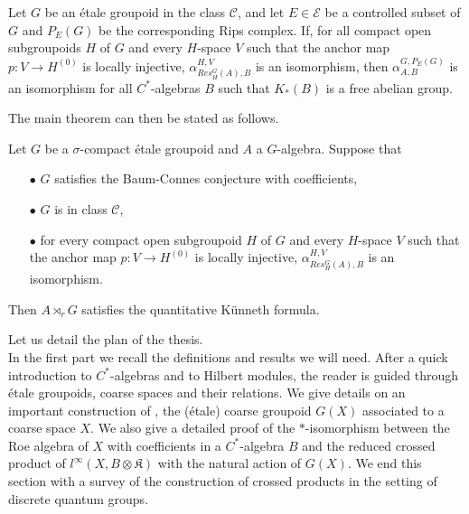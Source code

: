 \begin{itemize}
\begin{thm}
Let $G$ be an étale groupoid in the class $\mathcal C$, and let $E\in\mathcal E$ be a controlled subset of $G$ and $P_E(G)$ be the corresponding Rips complex. If, for all compact open subgroupoids $H$ of $G$ and every $H$-space $V$ such that the anchor map $p : V\rightarrow H^{(0)}$ is locally injective, $\alpha_{Res_H^G(A),B}^{H,V}$ is an isomorphism, then $\alpha_{A,B}^{G,P_E(G)}$ is an isomorphism for all $C^*$-algebras $B$ such that $K_*(B)$ is a free abelian group.\\
\end{thm}

The main theorem can then be stated as follows.\\

\begin{thm}
Let $G$ be a $\sigma$-compact étale groupoid and $A$ a $G$-algebra. Suppose that 
\begin{itemize}
\item[$\bullet$] $G$ satisfies the Baum-Connes conjecture with coefficients,
\item[$\bullet$] $G$ is in class $\mathcal C$,
\item[$\bullet$] for every compact open subgroupoid $H$ of $G$ and every $H$-space $V$ such that the anchor map $p : V \rightarrow H^{(0)}$ is locally injective, $\alpha_{Res_H^G(A),B}^{H,V}$ is an isomorphism.
\end{itemize} 
Then $A\rtimes_r G$ satisfies the quantitative Künneth formula.\\
\end{thm}

\end{itemize}


Let us detail the plan of the thesis.\\ 

In the first part we recall the definitions and results we will need. After a quick introduction to $C^*$-algebras and to Hilbert modules, the reader is guided through étale groupoids, coarse spaces and their relations. We give details on an important construction of \cite{SkTuYu}, the (étale) coarse groupoid $G(X)$ associated to a coarse space $X$. We also give a detailed proof of the $*$-isomorphism between the Roe algebra of $X$ with coefficients in a $C^*$-algebra $B$ and the reduced crossed product of $l^\infty (X,B\otimes\mathfrak K)$ with the natural action of $G(X)$. We end this section with a survey of the construction of crossed products in the setting of discrete quantum groups.\\
 

